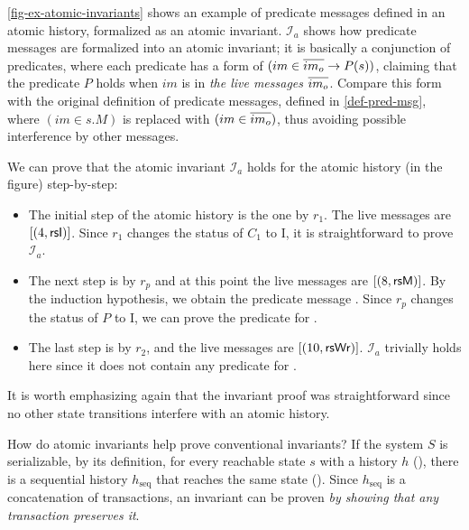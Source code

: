 \autoref{fig-ex-atomic-invariants} shows an example of predicate messages defined in an atomic history, formalized as an atomic invariant.
$\mathcal{I}_a$ shows how predicate messages are formalized into an atomic invariant; it is basically a conjunction of predicates, where each predicate has a form of $(im \in \overline{im_o} \to P(s))$, claiming that the predicate $P$ holds when $im$ is in \emph{the live messages} $\overline{im_o}$.
Compare this form with the original definition of predicate messages, defined in \autoref{def-pred-msg}, where $(im \in s.M)$ is replaced with $(im \in \overline{im_o})$, thus avoiding possible interference by other messages.

We can prove that the atomic invariant $\mathcal{I}_a$ holds for the atomic history (in the figure) step-by-step:
\begin{itemize}[leftmargin=*]
\item The initial step of the atomic history is the one by $r_1$. The live messages are $\lbrack (4, \textsf{rsI}) \rbrack$. Since $r_1$ changes the status of $C_1$ to I, it is straightforward to prove $\mathcal{I}_a$.
\item The next step is by $r_p$ and at this point the live messages are $\lbrack (8, \textsf{rsM}) \rbrack$. By the induction hypothesis, we obtain the predicate message . Since $r_p$ changes the status of $P$ to I, we can prove the predicate for .
\item The last step is by $r_2$, and the live messages are $\lbrack (10, \textsf{rsWr}) \rbrack$. $\mathcal{I}_a$ trivially holds here since it does not contain any predicate for .
\end{itemize}
It is worth emphasizing again that the invariant proof was straightforward since no other state transitions interfere with an atomic history.

How do atomic invariants help prove conventional invariants?
If the system $S$ is serializable, by its definition, for every reachable state $s$ with a history $h$ (), there is a sequential history $h_\textrm{seq}$ that reaches the same state ().
Since $h_\textrm{seq}$ is a concatenation of transactions, an invariant can be proven \emph{by showing that any transaction preserves it}.

